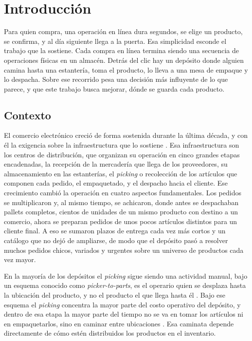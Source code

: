 \chapter{Introducción}
\label{chapter:intro}

Para quien compra, una operación en línea dura segundos, se elige un producto, se confirma, y al día siguiente llega a la puerta.
Esa simplicidad esconde el trabajo que la sostiene.
Cada compra en línea termina siendo una secuencia de operaciones físicas en un almacén.
Detrás del clic hay un depósito donde alguien camina hasta una estantería, toma el producto, lo lleva a una mesa de empaque y lo despacha.
Sobre ese recorrido pesa una decisión más influyente de lo que parece, y que este trabajo busca mejorar, dónde se guarda cada producto.

\section{Contexto}

El comercio electrónico creció de forma sostenida durante la última década, y con él la exigencia sobre la infraestructura que lo sostiene \citep{boysen2019warehousing}.
Esa infraestructura son los centros de distribución, que organizan su operación en cinco grandes etapas encadenadas, la recepción de la mercadería que llega de los proveedores, su almacenamiento en las estanterías, el \emph{picking} o recolección de los artículos que componen cada pedido, el empaquetado, y el despacho hacia el cliente.
Ese crecimiento cambió la operación en cuatro aspectos fundamentales.
Los pedidos se multiplicaron y, al mismo tiempo, se achicaron, donde antes se despachaban pallets completos, cientos de unidades de un mismo producto con destino a un comercio, ahora se preparan pedidos de unos pocos artículos distintos para un cliente final.
A eso se sumaron plazos de entrega cada vez más cortos y un catálogo que no dejó de ampliarse, de modo que el depósito pasó a resolver muchos pedidos chicos, variados y urgentes sobre un universo de productos cada vez mayor.

En la mayoría de los depósitos el \emph{picking} sigue siendo una actividad manual, bajo un esquema conocido como \emph{picker-to-parts}, es el operario quien se desplaza hasta la ubicación del producto, y no el producto el que llega hasta él \citep{dekoster2007design}.
Bajo ese esquema el \emph{picking} concentra la mayor parte del costo operativo del depósito, y dentro de esa etapa la mayor parte del tiempo no se va en tomar los artículos ni en empaquetarlos, sino en caminar entre ubicaciones \citep{dekoster2007design, tompkins2010facilities}.
Esa caminata depende directamente de cómo estén distribuidos los productos en el inventario.

